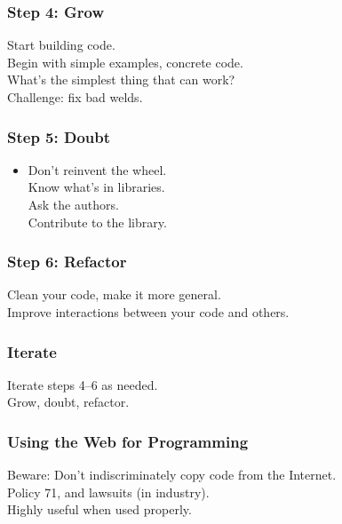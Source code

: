 \begin{frame}
\frametitle{Step 4: Grow}
\begin{changemargin}{1.5cm}
\Large
Start building code.\\[1em]
Begin with simple examples, concrete code.\\[1em]
What's the simplest thing that can work?\\[1em]
Challenge: fix bad welds.
\end{changemargin}
\end{frame}

\begin{frame}
\frametitle{Step 5: Doubt}

\Large
\begin{changemargin}{2cm}
\begin{itemize}
\item Don't reinvent the wheel.\\
 Know what's in libraries.\\
 Ask the authors.\\
 Contribute to the library.
\end{itemize}
\end{changemargin}

\end{frame}

\begin{frame}
\frametitle{Step 6: Refactor}

\Large
\begin{changemargin}{2cm}
Clean your code, make it more general.\\[1em]
Improve interactions between your code and others.
\end{changemargin}

\end{frame}

\begin{frame}
\frametitle{Iterate}

\begin{changemargin}{1cm}
\Large
Iterate steps 4--6 as needed.\\
Grow, doubt, refactor.
\end{changemargin}
\end{frame}

\begin{frame}
\frametitle{Using the Web for Programming}

\begin{changemargin}{1cm}
Beware: Don't indiscriminately copy code from the Internet.\\
Policy 71, and lawsuits (in industry).\\[1em]

Highly useful when used properly.
\end{changemargin}

\end{frame}

